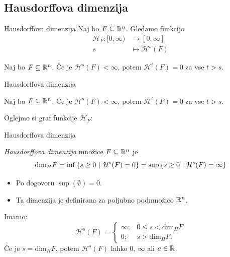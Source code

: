 \documentclass[10pt]{beamer}
\begin{document}
\subsection{Hausdorffova dimenzija}
\begin{frame}[t]{Hausdorffova dimenzija}
    Naj bo \(F \subseteq \mathbb{R}^n\). Gledamo funkcijo 
    \begin{align*}
        \mathcal{H}_F: [0, \infty) &\longrightarrow [0, \infty] \\
        s &\longmapsto \mathcal{H}^{s}(F)
    \end{align*}

    \begin{lema}
        Naj bo \(F \subseteq \mathbb{R}^n\). Če je \(\mathcal{H}^{s}(F) < \infty\), potem \(\mathcal{H}^{t}(F) = 0\) za vse \(t > s\).
    \end{lema}
\end{frame}

\begin{frame}[t]{Hausdorffova dimenzija}
    \begin{lema}
        Naj bo \(F \subseteq \mathbb{R}^n\). Če je \(\mathcal{H}^{s}(F) < \infty\), potem \(\mathcal{H}^{t}(F) = 0\) za vse \(t > s\).
    \end{lema}

    Oglejmo si graf funkcije \(\mathcal{H}_F\):
    \begin{center}
        \scalebox{0.8}{
            \drawGraf
        }        
    \end{center}    
\end{frame}

\begin{frame}[t]{Hausdorffova dimenzija}
    \begin{definicija}
        \emph{Hausdorffova dimenzija} množice \(F \subseteq \mathbb{R}^n\) je 
        \[\text{dim}_H F = \inf \left\{s \geq 0 \ | \ \mathcal{H}^{s}(F) = 0\right\} = \sup \left\{s \geq 0 \ | \ \mathcal{H}^{s}(F) = \infty\right\}\]
    \end{definicija} 

    \pause
     {
        \begin{opomba}
            \begin{itemize}
                \item Po dogovoru \(\sup (\emptyset) = 0\).
                \item Ta dimenzija je definirana za poljubno podmnožico \(\mathbb{R}^n\).
            \end{itemize}   
        \end{opomba}
    }
    \pause 
    Imamo:
    \[
        \mathcal{H}^{s}(F) = \begin{cases}
            \infty; &0 \leq s < \text{dim}_H F \\ 
            0; &s > \text{dim}_H F;
        \end{cases}
    \]
    Če je \(s = \text{dim}_H F\), potem \(\mathcal{H}^{s}(F)\) lahko \(0, \  \infty\) ali \(a \in \mathbb{R}\).    
\end{frame}
\end{document}
